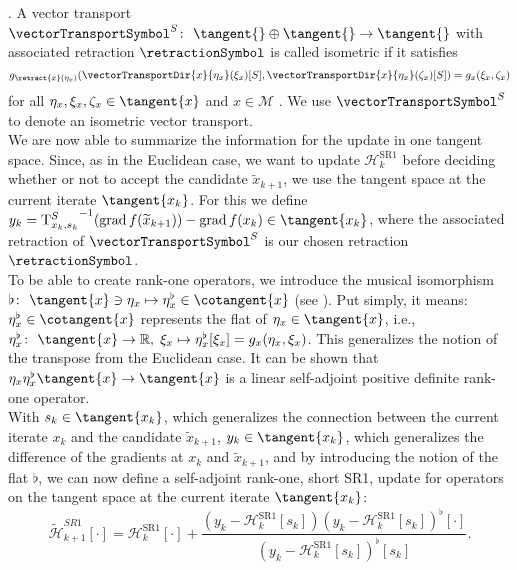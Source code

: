 \cite[Definition~8.1.1]{AbsilMahonySepulchre:2008}. A vector transport $\vectorTransportSymbol^S \colon \ \tangent{} \oplus \tangent{} \to \tangent{}$ with associated retraction $\retractionSymbol$ is called isometric if it satisfies
\begin{equation}\label{IsometricVectorTransport}
    g_{\retract{x}(\eta_x)}(\vectorTransportDir{x}{\eta_x}(\xi_x)[S], \vectorTransportDir{x}{\eta_x}(\zeta_x)[S]) = g_x (\xi_x, \zeta_x)
\end{equation}
for all $\eta_x, \xi_x, \zeta_x \in \tangent{x}$ and $x \in \mathcal{M}$ \cite[p.~10]{Huang:2013}. We use $\vectorTransportSymbol^S$ to denote an isometric vector transport. \\
We are now able to summarize the information for the update in one tangent space. Since, as in the Euclidean case, we want to update $\mathcal{H}^\mathrm{SR1}_k$ before deciding whether or not to accept the candidate $\widetilde{x}_{k+1}$, we use the tangent space at the current iterate $\tangent{x_k}$. For this we define $y_k = {\mathrm{T}^{S}_{x_k, s_k}}^{-1} ( \operatorname{grad}f(\widetilde{x}_{k+1}) ) - \operatorname{grad}f(x_k) \in \tangent{x_k}$, where the associated retraction of $\vectorTransportSymbol^S$ is our chosen retraction $\retractionSymbol$. \\
To be able to create rank-one operators, we introduce the musical isomorphism $\flat \colon \ \tangent{x} \ni \eta_{x} \mapsto \eta^{\flat}_{x} \in \cotangent{x}$ (see \cite[p.~6]{BergmannHerzogLouzeiroSilvaTenbrinckVidalNunez:2020:1}). Put simply, it means: $\eta^{\flat}_{x} \in \cotangent{x}$ represents the flat of $\eta_{x} \in \tangent{x}$, i.e., $\eta^{\flat}_{x} \colon \ \tangent{x} \to \mathbb{R}, \; \xi_{x} \mapsto \eta^{\flat}_{x}[\xi_{x}] = g_{x} (\eta_{x}, \xi_{x})$. This generalizes the notion of the transpose from the Euclidean case. It can be shown that $\eta_{x} \eta^{\flat}_{x} \tangent{x} \to \tangent{x}$ is a linear self-adjoint positive definite rank-one operator. \\
With $s_k \in \tangent{x_k}$, which generalizes the connection between the current iterate $x_k$ and the candidate $\widetilde{x}_{k+1}$, $y_k \in \tangent{x_k}$, which generalizes the difference of the gradients at $x_k$ and $\widetilde{x}_{k+1}$, and by introducing the notion of the flat $\flat$, we can now define a self-adjoint rank-one, short SR1, update for operators on the tangent space at the current iterate $\tangent{x_k}$:
\begin{equation}\label{RiemannianDirectSR1formula}
    \widetilde{\mathcal{H}}^{SR1}_{k+1} [\cdot] = \mathcal{H}^\mathrm{SR1}_k [\cdot] + \frac{(y_k - \mathcal{H}^\mathrm{SR1}_k [s_k]) (y_k - \mathcal{H}^\mathrm{SR1}_k [s_k])^{\flat} [\cdot] }{(y_k - \mathcal{H}^\mathrm{SR1}_k [s_k])^{\flat} [s_k]}.
\end{equation}
